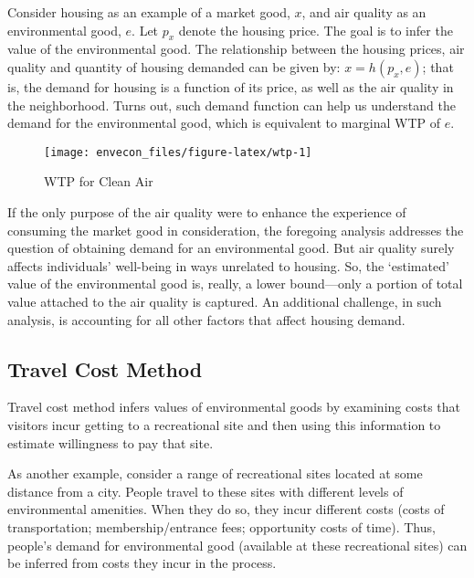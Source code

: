 \documentclass[
]{book}
\begin{document}
Consider housing as an example of a market good, \(x\), and air quality as an environmental good, \(e\). Let \(p_x\) denote the housing price. The goal is to infer the value of the environmental good. The relationship between the housing prices, air quality and quantity of housing demanded can be given by: \(x=h(p_x,e)\); that is, the demand for housing is a function of its price, as well as the air quality in the neighborhood. Turns out, such demand function can help us understand the demand for the environmental good, which is equivalent to marginal WTP of \(e\).

\begin{figure}

{\centering \texttt{[image: envecon\_files/figure-latex/wtp-1]} 

}

\caption{WTP for Clean Air}\label{fig:wtp}
\end{figure}

If the only purpose of the air quality were to enhance the experience of consuming the market good in consideration, the foregoing analysis addresses the question of obtaining demand for an environmental good. But air quality surely affects individuals' well-being in ways unrelated to housing. So, the `estimated' value of the environmental good is, really, a lower bound---only a portion of total value attached to the air quality is captured. An additional challenge, in such analysis, is accounting for all other factors that affect housing demand.

\hypertarget{travel-cost-method}{%
\subsection{Travel Cost Method}\label{travel-cost-method}}

Travel cost method infers values of environmental goods by examining costs that visitors incur getting to a recreational site and then using this information to estimate willingness to pay that site.

As another example, consider a range of recreational sites located at some distance from a city. People travel to these sites with different levels of environmental amenities. When they do so, they incur different costs (costs of transportation; membership/entrance fees; opportunity costs of time). Thus, people's demand for environmental good (available at these recreational sites) can be inferred from costs they incur in the process.
\end{document}
